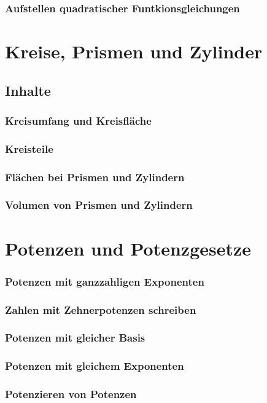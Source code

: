 \documentclass{article}
\begin{document}
\subsubsection*{Aufstellen quadratischer Funtkionsgleichungen}
\newpage
\section{Kreise, Prismen und Zylinder}
\subsection{Inhalte}
\subsubsection*{Kreisumfang und Kreisfläche}
\subsubsection*{Kreisteile}
\subsubsection*{Flächen bei Prismen und Zylindern}
\subsubsection*{Volumen von Prismen und Zylindern}
\newpage
\section{Potenzen und Potenzgesetze}
\subsubsection*{Potenzen mit ganzzahligen Exponenten}
\subsubsection*{Zahlen mit Zehnerpotenzen schreiben}
\subsubsection*{Potenzen mit gleicher Basis}
\subsubsection*{Potenzen mit gleichem Exponenten}
\subsubsection*{Potenzieren von Potenzen}
\end{document}
